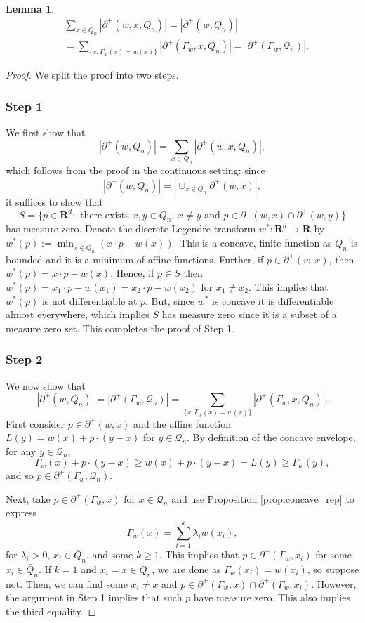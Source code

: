 \documentclass[12pt]{amsart}
\newcommand{\R}{\mathbf{R}}
\newtheorem{lemma}[theorem]{Lemma}
\begin{document}
\begin{lemma} \label{MA-rep} 
\[
\begin{aligned}
&\sum_{x \in Q_n} |\partial^+(w, x, Q_n)| = |\partial^+(w, Q_n)| \\
&=  \sum_{\{ x: \Gamma_w(x) = w(x) \}}  |\partial^+(\Gamma_w, x, Q_n)| = |\partial^+(\Gamma_w, \mathcal{Q}_n)|. 
\end{aligned}
\]
\end{lemma}

\begin{proof}
We split the proof into two steps.
\subsubsection*{Step 1}
We first show that 
\[
|\partial^+(w, Q_n)| = \sum_{x \in Q_n} |\partial^+(w, x, Q_n)|, 
\]
which follows from the proof in the continuous setting:
since 
\[
|\partial^+(w, Q_n)| = | \cup_{x \in Q_n} \partial^+(w, x)|, 
\]
it suffices to show that
\[
S = \{ p \in \R^d : \mbox{ there exists $x,y \in Q_n$, $x \not = y$ and $p \in \partial^+(w, x) \cap \partial^+(w, y)$} \} 
\]
has measure zero.  Denote the discrete Legendre transform $w^*: \R^d \to \R$ by  $w^*(p) := \min_{x \in \bar{Q}_n} (x \cdot p - w(x))$. This is a concave, finite function as $Q_n$ is bounded
and it is a minimum of affine functions.  Further,  if $p \in \partial^+(w, x)$, then $w^*(p) = x \cdot p - w(x)$. Hence, if $p \in S$ then $w^*(p) = x_1 \cdot p - w(x_1) = x_2 \cdot p - w(x_2)$ for $x_1 \not = x_2$. This implies that $w^*(p)$ is not differentiable at $p$. But, since $w^*$ is concave it is differentiable almost everywhere, which implies $S$ has measure zero since it is a subset of a measure zero set. This completes the proof of Step 1. 


\subsubsection*{Step 2} 
We now show that 
\[
|\partial^+(w, Q_n)| = |\partial^+(\Gamma_w, \mathcal{Q}_n)|  = \sum_{\{ x: \Gamma_w(x) = w(x) \}}  |\partial^+(\Gamma_w, x, Q_n)|.
\]
First consider $p \in \partial^+(w, x)$ and the affine function $L(y) = w(x) + p \cdot(y-x)$ for $y \in \mathcal{Q}_n$. By definition of the concave envelope, for any $y \in \mathcal{Q}_n$, 
\[
\Gamma_w(x) + p \cdot (y-x) \geq w(x) + p \cdot(y-x) = L(y) \geq \Gamma_w(y),
\]
and so $p \in \partial^+(\Gamma_w, \mathcal{Q}_n)$.

Next, take $p \in \partial^+(\Gamma_w, x)$ for $x \in \mathcal{Q}_n$ and use Proposition \ref{prop:concave_rep} to express 
\[
\Gamma_w(x)  = \sum_{i=1}^{k} \lambda_i w(x_i), 
\] 
for $\lambda_i > 0$, $x_i \in \bar{Q}_n$, and some $k \geq 1$. This implies that $p \in \partial^+(\Gamma_w, x_i)$ for some $x_i \in \bar{Q}_n$. If $k = 1$ and $x_i = x \in Q_n$, we are done as $\Gamma_w(x_i) = w(x_i)$, so suppose not.  Then, we can find some $x_i \not = x$ and $p \in \partial^+(\Gamma_w, x) \cap \partial^+(\Gamma_w, x_i)$. 
However, the argument in Step 1 implies that such $p$ have measure zero. This also implies the third equality. 






\end{proof}
\end{document}
